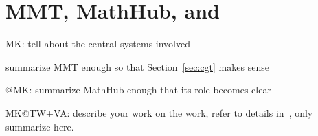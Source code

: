 \section{MMT, MathHub, and \SCSCP}\label{sec:sys}
\begin{todolist}{MK: tell about the central systems involved}
\item summarize MMT enough so that Section~\ref{sec:cgt} makes sense
\item @MK: summarize MathHub enough that its role becomes clear
\item MK@TW+VA: describe your work on the \SCSCP work, refer to details
  in~\cite{twiesing:msc17}, only summarize here.
\end{todolist}


